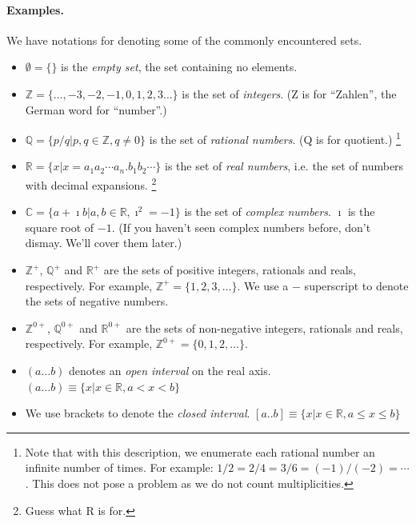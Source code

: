 \paragraph{Examples.}
We have notations for denoting some of the commonly encountered sets.
\begin{itemize}
\item
$\emptyset = \{\}$ is the \textit{empty set}, the set containing no elements.
\item
$\mathbb{Z} = \{\ldots, -3, -2, -1, 0, 1, 2, 3 \ldots\}$ is the set of 
\textit{integers}.  (Z is for ``Zahlen'', the German word for ``number''.)
\item
$\mathbb{Q} = \{ p / q | p,q \in \mathbb{Z}, q \neq 0 \}$ is the set of 
\textit{rational numbers}.  (Q is for quotient.)
\footnote{
  Note that with this description, we enumerate each rational number an 
  infinite number of times.  For example: $1/2 = 2/4 = 3/6 = (-1)/(-2) = \cdots$.
  This does not pose a problem as we do not count multiplicities.
}
\item
$\mathbb{R} = \{ x | x = a_1 a_2 \cdots a_n.b_1 b_2 \cdots \}$ is the set
of \textit{real numbers}, i.e. the set of numbers with decimal expansions.
\footnote{Guess what R is for.}
\item
$\mathbb{C} = \{ a + \imath b | a,b \in \mathbb{R}, \imath^2 = -1 \}$ is the set of 
\textit{complex numbers}.  $\imath$ is the square root of $-1$.  
(If you haven't seen complex numbers before, don't dismay.  
We'll cover them later.)
\item
$\mathbb{Z}^+$, $\mathbb{Q}^+$ and $\mathbb{R}^+$ are the sets of 
positive integers, rationals and reals, respectively.  For example,
$\mathbb{Z}^+ = \{1, 2, 3, \ldots\}$.  We use a $-$ superscript to denote 
the sets of negative numbers.
\item
$\mathbb{Z}^{0+}$, $\mathbb{Q}^{0+}$ and $\mathbb{R}^{0+}$ are the sets of 
non-negative integers, rationals and reals, respectively.  For example,
$\mathbb{Z}^{0+} = \{0, 1, 2, \ldots\}$.
\item
$(a \ldots b)$ denotes an \textit{open interval} on the real axis.
$(a \ldots b) \equiv \{ x | x \in \mathbb{R}, a < x < b \}$
\item
We use brackets to denote the \textit{closed interval}.
$[a .. b] \equiv \{ x | x \in \mathbb{R}, a \leq x \leq b \}$
\end{itemize}



